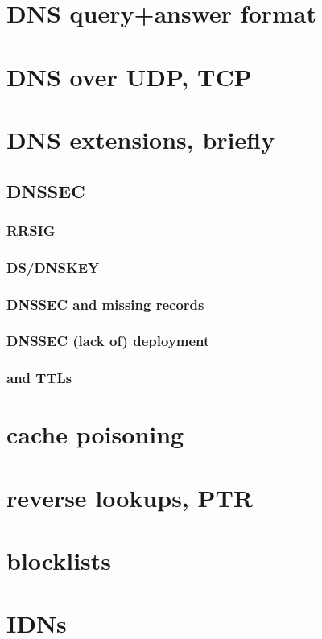 \section{DNS query+answer format}


\section{DNS over UDP, TCP}


\section{DNS extensions, briefly}


\subsection{DNSSEC}


\subsubsection{RRSIG}


\subsubsection{DS/DNSKEY}


\subsubsection{DNSSEC and missing records}


\subsubsection{DNSSEC (lack of) deployment}


\subsubsection{and TTLs}

\section{cache poisoning}



\section{reverse lookups, PTR}


\section{blocklists}


\section{IDNs}


